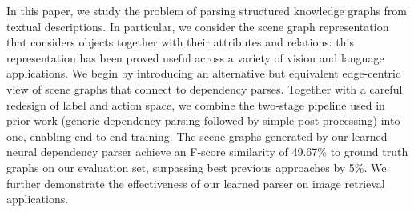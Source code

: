 In this paper, we study the problem of parsing structured knowledge graphs from textual descriptions. In particular, we consider the scene graph representation that considers objects together with their attributes and relations: this representation has been proved useful across a variety of vision and language applications. We begin by introducing an alternative but equivalent edge-centric view of scene graphs that connect to dependency parses. Together with a careful redesign of label and action space, we combine the two-stage pipeline used in prior work (generic dependency parsing followed by simple post-processing) into one, enabling end-to-end training. The scene graphs generated by our learned neural dependency parser achieve an F-score similarity of 49.67\% to ground truth graphs on our evaluation set, surpassing best previous approaches by 5\%. We further demonstrate the effectiveness of our learned parser on image retrieval applications.
